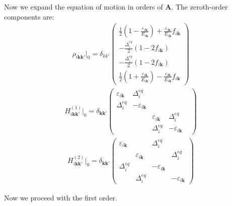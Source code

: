 \documentclass[a4paper]{article}
\begin{document}
Now we expand the equation of motion in orders of $\mathbf{A}$. The zeroth-order
components are:
\begin{eqnarray*}
  \rho_{i\mathbf{kk'}}\big|_0 = \delta_{kk'} 
  \begin{pmatrix}
    \frac{1}{2}\left(1-\frac{\varepsilon_{i\mathbf{k}}}{E_{i\mathbf{k}}}\right)
    +\frac{\varepsilon_{i\mathbf{k}}}{ E_{i\mathbf{k}}}f_{i\mathbf{k}}
    \\
    -\frac{\Delta^{eq}_i}{2}(1-2f_{i\mathbf{k}})
    \\
    -\frac{\Delta^{eq}_i}{2}(1-2f_{i\mathbf{k}})
    \\
    \frac{1}{2}\left(1+\frac{\varepsilon_{i\mathbf{k}}}{E_{i\mathbf{k}}}\right)
    -\frac{\varepsilon_{i\mathbf{k}}}{ E_{i\mathbf{k}}}f_{i\mathbf{k}}
  \end{pmatrix}
\end{eqnarray*}
\begin{eqnarray*}
  H_{i\mathbf{kk'}}^{(1)}\big|_0
  =
  \delta_{\mathbf{kk'}}
  \begin{pmatrix}
    \varepsilon_{i\mathbf{k}} & \Delta^{eq}_i & & \\
    \Delta^{eq}_i & -\varepsilon_{i\mathbf{k}} & & \\
    && \varepsilon_{i\mathbf{k}} & \Delta^{eq}_i \\
    && \Delta^{eq}_i & -\varepsilon_{i\mathbf{k}} & 
  \end{pmatrix}
\end{eqnarray*}
\begin{eqnarray*}
  H_{i\mathbf{kk'}}^{(2)}\big|_0
  =
  \delta_{\mathbf{kk'}}
  \begin{pmatrix}
    \varepsilon_{i\mathbf{k}} && \Delta^{eq}_i & \\
    & \varepsilon_{i\mathbf{k}} && \Delta^{eq}_i \\
    \Delta^{eq}_i && -\varepsilon_{i\mathbf{k}} & \\
    & \Delta^{eq}_i && -\varepsilon_{i\mathbf{k}}
  \end{pmatrix}
\end{eqnarray*}

Now we proceed with the first order.
\end{document}
